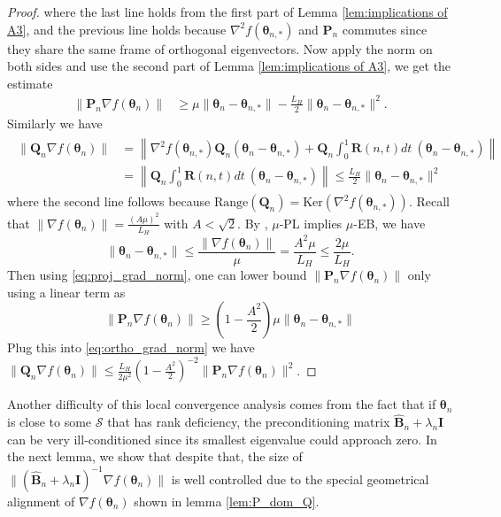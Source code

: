 \documentclass[11pt]{amsart}
\theoremstyle{plain}
\theoremstyle{definition}
\theoremstyle{remark}
\def\bQ{\mathbf{Q}}
\def\bP{\mathbf{P}}
\def\bR{\mathbf{R}}
\def\eps{\varepsilon}
\def\B{\mathbf{B}}
\def\param{\boldsymbol{\theta}}
\newcommand{\commHL}[1]{{\textcolor{blue}{#1}}}
\begin{document}
\begin{proof}
   where the last line holds from the first part of Lemma \ref{lem:implications of A3}, and the previous line holds because $\nabla^2f(\param_{n,*})$ and $\bP_{n}$ commutes since they share the same frame of orthogonal eigenvectors. Now apply the norm on both sides and use the second part of Lemma \ref{lem:implications of A3}, we get the estimate
   \begin{align}\label{eq:proj_grad_norm}
        \|\bP_{n}\nabla f(\param_n)\|&\geq \mu \|\param_n-\param_{n,*}\|-\frac{L_H}{2}\|\param_n-\param_{n,*}\|^2.
   \end{align}
   Similarly we have
   \begin{gather}\label{eq:ortho_grad_norm}
   \begin{aligned}
       \|\bQ_{n}\nabla f(\param_n)\|&=\left\|\nabla^2 f(\param_{n,*})\bQ_{n}(\param_n-\param_{n,*})+\bQ_{n}\int_{0}^{1}\bR(n,t)dt \ (\param_n-\param_{n,*})\right\|\\
       &= \left\|\bQ_{n}\int_{0}^{1}\bR(n,t)dt \ (\param_n-\param_{n,*}) \right\| \leq \frac{L_H}{2}\|\param_n-\param_{n,*}\|^2
   \end{aligned}
   \end{gather}
   where the second line follows because $\text{Range}(\bQ_{n})=\text{Ker}(\nabla^2f(\param_{n,*})).$
   Recall that $\|\nabla f(\param_n)\|= \frac{(A\mu)^2}{L_H}$ with $A<\sqrt{2}.$ By \cite{rebjock2024fast}, $\mu$-PL implies $\mu$-EB, we have 
   \[
   \|\param_n-\param_{n,*}\|\leq \frac{\|\nabla f(\param_n)\|}{\mu}=\frac{A^2\mu}{L_H}\leq \frac{2\mu}{L_H}.
   \]
   Then using \eqref{eq:proj_grad_norm}, one can lower bound $ \|\bP_{n}\nabla f(\param_n)\|$ only using a linear term as
   \[
   \|\bP_{n}\nabla f(\param_n)\|\geq \left(1-\frac{A^2}{2}\right)\mu\|\param_n-\param_{n,*}\|
   \]
   Plug this into \eqref{eq:ortho_grad_norm} we have $\|\bQ_{n}\nabla f(\param_n)\|\leq \frac{L_H}{2\mu^2}\left(1-\frac{A^2}{2}\right)^{-2}\|\bP_{n}\nabla f(\param_n)\|^2$.
\end{proof}

Another difficulty of this local convergence analysis comes from the fact that if $\param_n$ is close to some $\mathcal{S}$ that has rank deficiency, the preconditioning matrix $\hat{\B}_n+\lambda_n\mathbf{I}$ can be very ill-conditioned since its smallest eigenvalue could approach zero.
In the next lemma, we show that despite that, the size of $\|(\hat{\B}_n+\lambda_n\mathbf{I})^{-1}\nabla f(\param_n)\|$ is well controlled due to the special geometrical alignment of $\nabla f(\param_n)$ shown in lemma \ref{lem:P_dom_Q}.
\end{document}
